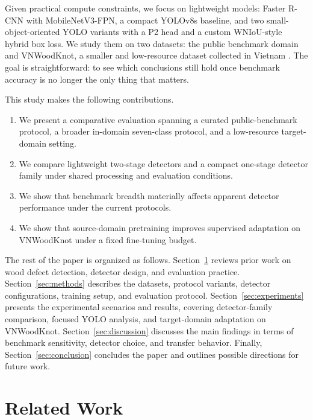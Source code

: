 \documentclass[10pt,a4paper]{article}
\begin{document}
Given practical compute constraints, we focus on lightweight models: Faster R-CNN with MobileNetV3-FPN, a compact YOLOv8s baseline, and two small-object-oriented YOLO variants with a P2 head and a custom WNIoU-style hybrid box loss. We study them on two datasets: the public benchmark domain \citep{kodytek_dataset} and VNWoodKnot, a smaller and low-resource dataset collected in Vietnam \citep{TRAN2025112039}. The goal is straightforward: to see which conclusions still hold once benchmark accuracy is no longer the only thing that matters.

This study makes the following contributions.

\begin{enumerate}[leftmargin=1.5em]
  \item We present a comparative evaluation spanning a curated public-benchmark protocol, a broader in-domain seven-class protocol, and a low-resource target-domain setting.
  \item We compare lightweight two-stage detectors and a compact one-stage detector family under shared processing and evaluation conditions.
  \item We show that benchmark breadth materially affects apparent detector performance under the current protocols.
    \item We show that source-domain pretraining improves supervised adaptation on VNWoodKnot under a fixed fine-tuning budget.
\end{enumerate}

The rest of the paper is organized as follows. Section~\ref{sec:related-work} reviews prior work on wood defect detection, detector design, and evaluation practice. Section~\ref{sec:methods} describes the datasets, protocol variants, detector configurations, training setup, and evaluation protocol. Section~\ref{sec:experiments} presents the experimental scenarios and results, covering detector-family comparison, focused YOLO analysis, and target-domain adaptation on VNWoodKnot. Section~\ref{sec:discussion} discusses the main findings in terms of benchmark sensitivity, detector choice, and transfer behavior. Finally, Section~\ref{sec:conclusion} concludes the paper and outlines possible directions for future work.

\section{Related Work}
\label{sec:related-work}

\end{document}
